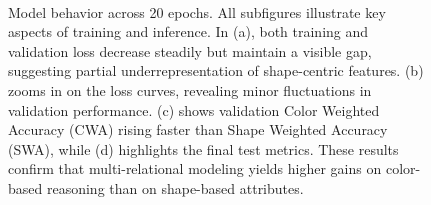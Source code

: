 \documentclass{article} %
\theoremstyle{plain}
\theoremstyle{definition}
\theoremstyle{remark}
\begin{document}
\begin{figure}[t]
\centering
{}
\\
\caption{Model behavior across 20 epochs. All subfigures illustrate key aspects of training and inference. In (a), both training and validation loss decrease steadily but maintain a visible gap, suggesting partial underrepresentation of shape-centric features. (b) zooms in on the loss curves, revealing minor fluctuations in validation performance. (c) shows validation Color Weighted Accuracy (CWA) rising faster than Shape Weighted Accuracy (SWA), while (d) highlights the final test metrics. These results confirm that multi-relational modeling yields higher gains on color-based reasoning than on shape-based attributes.}
\label{fig:combined_main}
\end{figure}
\end{document}
